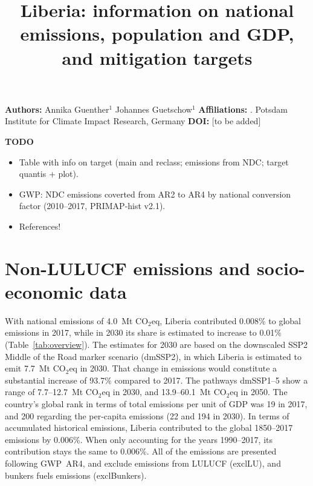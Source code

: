 \documentclass[12pt]{article}
\title{ \bfseries \color{PIKorange} Liberia: information on national emissions, population and GDP, and mitigation targets}
\begin{document}
 \maketitle

 \noindent \textbf{Authors:} \newline
 \indent Annika Guenther$^{1}$ \newline
 \indent Johannes Guetschow$^{1}$ \newline
 \noindent \textbf{Affiliations:} \newline
 . Potsdam Institute for Climate Impact Research, Germany \newline
 \noindent \textbf{DOI:} [to be added] \newline

 \textbf{TODO}
 \begin{itemize}
 \item Table with info on target (main and reclass; emissions from NDC; target quantis + plot).
 \item GWP: NDC emissions coverted from AR2 to AR4 by national conversion factor (2010--2017, PRIMAP-hist v2.1).
 \item References!
 \end{itemize}

 \newpage %
 \section{Non-LULUCF emissions and socio-economic data}
 \label{sec:nonLULUCFSocioEco}
 With national emissions of 4.0~Mt CO$_2$eq, Liberia contributed 0.008\% to global emissions in 2017, while in 2030 its share is estimated to increase to 0.01\% (Table~\ref{tab:overview}).
 The estimates for 2030 are based on the downscaled SSP2 Middle of the Road marker scenario (dmSSP2), in which Liberia is estimated to emit 7.7~Mt CO$_2$eq in 2030.
 That change in emissions would constitute a substantial increase of 93.7\% compared to 2017. 
 The pathways dmSSP1--5 show a range of 7.7--12.7~Mt CO$_2$eq in 2030, and 13.9--60.1~Mt CO$_2$eq in 2050.
 The country's global rank in terms of total emissions per unit of GDP was 19 in 2017, and 200 regarding the per-capita emissions (22 and 194 in 2030).
 In terms of accumulated historical emissions, Liberia contributed to the global 1850--2017 emissions by 0.006\%. 
 When only accounting for the years 1990--2017, its contribution stays the same to 0.006\%.
 All of the emissions are presented following GWP~AR4, and exclude emissions from LULUCF (exclLU), and bunkers fuels emissions (exclBunkers).
\end{document}
